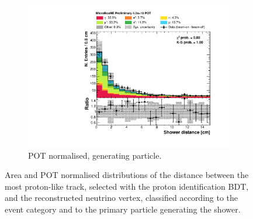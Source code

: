 \begin{figure}[htbp]
\begin{subfigure}{0.49\textwidth}
    \includegraphics[width=\linewidth]{figures/h_shower_distance_pdg.pdf}
    \caption{POT normalised, generating particle.} \label{fig:showerd_pdg}
  \end{subfigure}
  \caption{Area and POT normalised distributions of the distance between the most proton-like track, selected with the proton identification BDT, and the reconstructed neutrino vertex, classified according to the event category and to the primary particle generating the shower.}
\end{figure}


